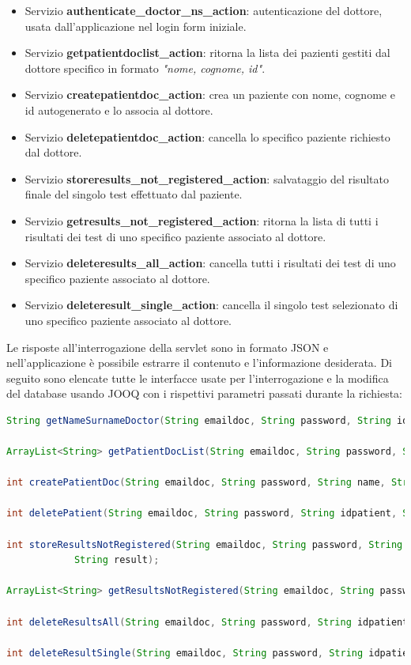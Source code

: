 \documentclass[
	corpo=12pt,
	twoside,
 	evenboxes,
	tipotesi=triennale,
    	stile=classica,
   	 greek,
]{toptesi}
\begin{document}
\begin{itemize}
\item Servizio \textbf{authenticate\_doctor\_ns\_action}: autenticazione del dottore, usata dall'applicazione nel login form iniziale.
\item Servizio \textbf{getpatientdoclist\_action}: ritorna la lista dei pazienti gestiti dal dottore specifico in formato \textit{"nome, cognome, id"}.
\item Servizio \textbf{createpatientdoc\_action}: crea un paziente con nome, cognome e id autogenerato e lo associa al dottore.
\item Servizio \textbf{deletepatientdoc\_action}: cancella lo specifico paziente richiesto dal dottore.
\item Servizio \textbf{storeresults\_not\_registered\_action}: salvataggio del risultato finale del singolo test effettuato dal paziente.
\item Servizio \textbf{getresults\_not\_registered\_action}: ritorna la lista di tutti i risultati dei test di uno specifico paziente associato al dottore.
\item Servizio \textbf{deleteresults\_all\_action}: cancella tutti i risultati dei test di uno specifico paziente associato al dottore.
\item Servizio \textbf{deleteresult\_single\_action}: cancella il singolo test selezionato di uno specifico paziente associato al dottore.
\end{itemize}

\newpage

Le risposte all'interrogazione della servlet sono in formato JSON e nell'applicazione è possibile estrarre il contenuto e l'informazione desiderata.
Di seguito sono elencate tutte le interfacce usate per l'interrogazione e la modifica del database usando JOOQ con i rispettivi parametri passati durante la richiesta:

\begin{lstlisting}[language=Java, label=lst:parameters, caption={Interfacce per l'interrogazione e la modifica del database}]
String getNameSurnameDoctor(String emaildoc, String password, String idapp);

ArrayList<String> getPatientDocList(String emaildoc, String password, String idapp);

int createPatientDoc(String emaildoc, String password, String name, String surname, String idapp);

int deletePatient(String emaildoc, String password, String idpatient, String idapp);

int storeResultsNotRegistered(String emaildoc, String password, String idpatient, String idapp, Timestamp datetime,
			String result);

ArrayList<String> getResultsNotRegistered(String emaildoc, String password, String idpatient, String idapp);

int deleteResultsAll(String emaildoc, String password, String idpatient, String idapp);

int deleteResultSingle(String emaildoc, String password, String idpatient, String idapp, String results);
\end{lstlisting}
\end{document}
